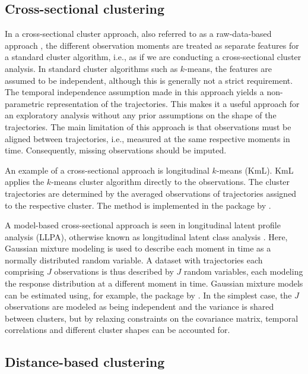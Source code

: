 \subsection{Cross-sectional clustering}\label{cross-sectional-clustering}

In a cross-sectional cluster approach, also referred to as a raw-data-based approach \citep{liao2005clustering}, the different observation moments are treated as separate features for a standard cluster algorithm, i.e., as if we are conducting a cross-sectional cluster analysis. In standard cluster algorithms such as \(k\)-means, the features are assumed to be independent, although this is generally not a strict requirement. The temporal independence assumption made in this approach yields a non-parametric representation of the trajectories. This makes it a useful approach for an exploratory analysis without any prior assumptions on the shape of the trajectories. The main limitation of this approach is that observations must be aligned between trajectories, i.e., measured at the same respective moments in time. Consequently, missing observations should be imputed.

An example of a cross-sectional approach is longitudinal \(k\)-means (KmL). KmL applies the \(k\)-means cluster algorithm directly to the observations. The cluster trajectories are determined by the averaged observations of trajectories assigned to the respective cluster. The method is implemented in the  package by \citet{genolini2015kml}.

A model-based cross-sectional approach is seen in longitudinal latent profile analysis (LLPA), otherwise known as longitudinal latent class analysis \citep{muthen2004latent}. Here, Gaussian mixture modeling is used to describe each moment in time as a normally distributed random variable. A dataset with trajectories each comprising \(J\) observations is thus described by \(J\) random variables, each modeling the response distribution at a different moment in time. Gaussian mixture models can be estimated using, for example, the  package by \citet{Scrucca2016mclust}. In the simplest case, the \(J\) observations are modeled as being independent and the variance is shared between clusters, but by relaxing constraints on the covariance matrix, temporal correlations and different cluster shapes can be accounted for.

\subsection{Distance-based clustering}\label{distance-based-clustering}

